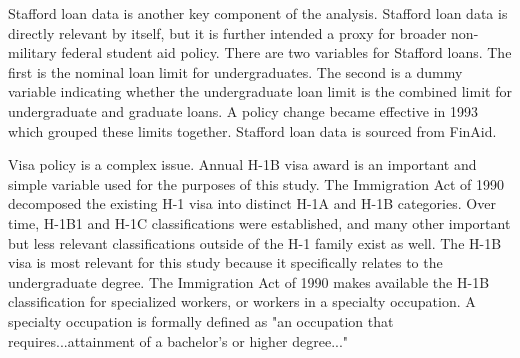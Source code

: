 \documentclass[review]{elsarticle}
\begin{document}
    Stafford loan data is another key component of the analysis.
    Stafford loan data is directly relevant by itself,
    but it is further intended a proxy for broader non-military federal student aid policy.
    There are two variables for Stafford loans.
    The first is the nominal loan limit for undergraduates.
    The second is a dummy variable indicating whether the undergraduate loan limit
    is the combined limit for undergraduate and graduate loans.
    A policy change became effective in 1993 which grouped these limits together.
    Stafford loan data is sourced from FinAid\cite{finaid_2020}.

    Visa policy is a complex issue.
    Annual H-1B visa award is an important and simple variable used for the purposes of this study.
    The Immigration Act of 1990 decomposed the existing H-1 visa into distinct H-1A and H-1B categories.
    Over time, H-1B1 and H-1C classifications were established,
    and many other important but less relevant classifications outside of the H-1 family exist as well.
    The H-1B visa is most relevant for this study because it specifically relates to the undergraduate degree.
    The Immigration Act of 1990 makes available the H-1B classification for specialized workers,
    or workers in a specialty occupation.
    A specialty occupation is formally defined as "an occupation that requires...attainment of a bachelor's or higher degree..."
\end{document}
